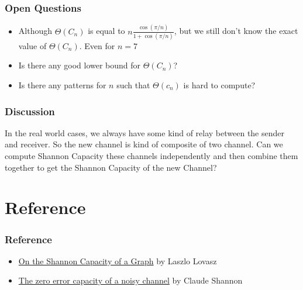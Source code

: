 \documentclass{beamer}
\begin{document}
            \begin{frame}
                  \frametitle{Open Questions}
                  \begin{itemize}
                        \item Although $\Theta(C_{n})$ is equal to $ n\frac{\cos(\pi/n)}{1+\cos(\pi/n)} $, but we still don't know the exact value of $\Theta(C_{n})$. Even for $n=7$
                        \item Is there any good lower bound for $\Theta(C_{n})$?
                        \item Is there any patterns for $n$ such that $\Theta(c_{n})$ is hard to compute?
                  \end{itemize}
            \end{frame}

            \begin{frame}
                  \frametitle{Discussion}

                  In the real world cases, we always have some kind of relay between the sender and receiver. So the new channel is kind of composite of two channel. Can we compute Shannon Capacity these channels independently and then combine them together to get the Shannon Capacity of the new Channel?
            \end{frame}

      \section{Reference}

            \begin{frame}
                  \frametitle{Reference}
                  \begin{itemize}
                        \item \href{https://ieeexplore.ieee.org/stamp/stamp.jsp?arnumber=1055985}{On the Shannon Capacity of a Graph} by Laszlo Lovasz
                        \item \href{https://ieeexplore.ieee.org/stamp/stamp.jsp?tp=&arnumber=1056798}{The zero error capacity of a noisy channel} by Claude Shannon
                  \end{itemize}
            \end{frame}
\end{document}
